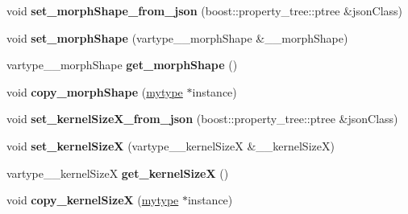 \begin{DoxyCompactItemize}
\item 
\mbox{\label{classfilter_1_1algos_1_1_erode_ae62c10b0d7de4db15353c3d31ec23e85}} 
void {\bfseries set\+\_\+morph\+Shape\+\_\+from\+\_\+json} (boost\+::property\+\_\+tree\+::ptree \&json\+Class)
\item 
\mbox{\label{classfilter_1_1algos_1_1_erode_aaf5fefca25e902b080f08a90e6430322}} 
void {\bfseries set\+\_\+morph\+Shape} (vartype\+\_\+\+\_\+morph\+Shape \&\+\_\+\+\_\+morph\+Shape)
\item 
\mbox{\label{classfilter_1_1algos_1_1_erode_a39687897a97d74f63902f362869898fd}} 
vartype\+\_\+\+\_\+morph\+Shape {\bfseries get\+\_\+morph\+Shape} ()
\item 
\mbox{\label{classfilter_1_1algos_1_1_erode_ab7fda02d0119f71b3ce87a1239df39a2}} 
void {\bfseries copy\+\_\+morph\+Shape} (\hyperlink{classfilter_1_1algos_1_1_erode}{mytype} $\ast$instance)
\item 
\mbox{\label{classfilter_1_1algos_1_1_erode_ab0a222589d1e566ac24c26fd36e7f2d7}} 
void {\bfseries set\+\_\+kernel\+Size\+X\+\_\+from\+\_\+json} (boost\+::property\+\_\+tree\+::ptree \&json\+Class)
\item 
\mbox{\label{classfilter_1_1algos_1_1_erode_aa2171026ed4aaa7f2d0cba470cb9b242}} 
void {\bfseries set\+\_\+kernel\+SizeX} (vartype\+\_\+\+\_\+kernel\+SizeX \&\+\_\+\+\_\+kernel\+SizeX)
\item 
\mbox{\label{classfilter_1_1algos_1_1_erode_a8b6d26b1c233380cc06b9076fd6f7cb8}} 
vartype\+\_\+\+\_\+kernel\+SizeX {\bfseries get\+\_\+kernel\+SizeX} ()
\item 
\mbox{\label{classfilter_1_1algos_1_1_erode_a153940be3d6f373b16c1a1c795ccc865}} 
void {\bfseries copy\+\_\+kernel\+SizeX} (\hyperlink{classfilter_1_1algos_1_1_erode}{mytype} $\ast$instance)
\item 
\mbox{\label{classfilter_1_1algos_1_1_erode_a08b82a5bd31318de2303e30749de6a4e}} 

\end{DoxyCompactItemize}
